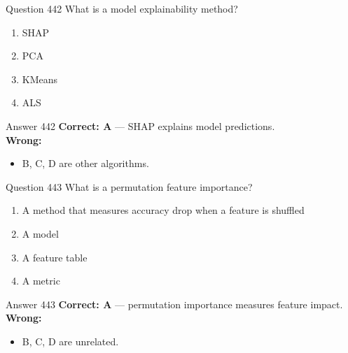 \documentclass[aspectratio=169,11pt]{beamer}
\begin{document}
	\begin{frame}{Question 442}
		What is a model explainability method?
		\begin{enumerate}[label=\Alph*.]
			\item SHAP
			\item PCA
			\item KMeans
			\item ALS
		\end{enumerate}
	\end{frame}
	\begin{frame}{Answer 442}
		\textbf{Correct: A} --- SHAP explains model predictions.\\
		\vspace{0.5em}
		\textbf{Wrong:}
		\begin{itemize}
			\item B, C, D are other algorithms.
		\end{itemize}
	\end{frame}
	
	\begin{frame}{Question 443}
		What is a permutation feature importance?
		\begin{enumerate}[label=\Alph*.]
			\item A method that measures accuracy drop when a feature is shuffled
			\item A model
			\item A feature table
			\item A metric
		\end{enumerate}
	\end{frame}
	\begin{frame}{Answer 443}
		\textbf{Correct: A} --- permutation importance measures feature impact.\\
		\vspace{0.5em}
		\textbf{Wrong:}
		\begin{itemize}
			\item B, C, D are unrelated.
		\end{itemize}
	\end{frame}
	
\end{document}
